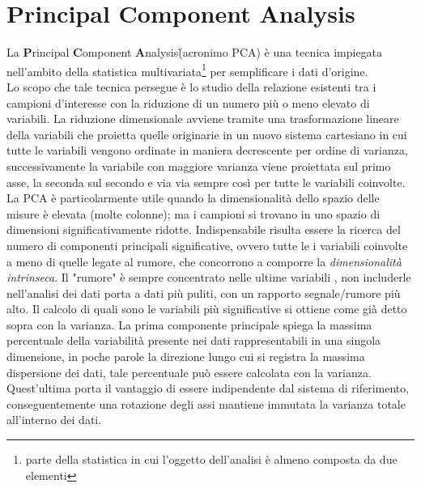 \section{Principal Component Analysis}
\label{PCA}

La \textbf{P}rincipal \textbf{C}omponent \textbf{A}nalysis\` (acronimo PCA) \`e una tecnica impiegata nell'ambito della statistica multivariata\footnote{parte della statistica in cui l'oggetto dell'analisi \`e almeno composta da due elementi} per semplificare i dati d'origine.\\
Lo scopo che tale tecnica persegue \`e lo studio della relazione esistenti tra i campioni d'interesse con la riduzione di un numero pi\`u o meno elevato di variabili. La riduzione dimensionale avviene tramite una trasformazione lineare della variabili che proietta quelle originarie in un nuovo sistema cartesiano in cui tutte le variabili vengono ordinate in maniera decrescente per ordine di varianza, successivamente la variabile con maggiore varianza viene proiettata sul primo asse, la seconda sul secondo e via via sempre cos\`i per tutte le variabili coinvolte. La PCA \`	e particolarmente utile quando la dimensionalit\`a dello spazio delle misure \`e elevata (molte colonne); ma i campioni si trovano in uno spazio di dimensioni significativamente ridotte. Indispensabile risulta essere la ricerca del numero di componenti principali significative, ovvero tutte le i variabili coinvolte a meno di quelle legate al rumore, che concorrono a comporre la \textit{dimensionalit\`a intrinseca}. Il "rumore" \`e sempre concentrato nelle ultime variabili , non includerle nell'analisi dei dati porta a dati pi\`u puliti, con un rapporto segnale/rumore pi\`u alto.
Il calcolo di quali sono le variabili pi\`u significative si ottiene come gi\`a detto sopra con la varianza. La prima componente principale spiega la massima percentuale della variabilit\`a presente nei dati rappresentabili in una singola dimensione, in poche parole la direzione lungo cui si registra la massima dispersione dei dati, tale percentuale pu\`o essere calcolata con la varianza. Quest'ultima porta il vantaggio di essere indipendente dal sistema di riferimento, conseguentemente una rotazione degli assi mantiene immutata la varianza totale all'interno dei dati.
